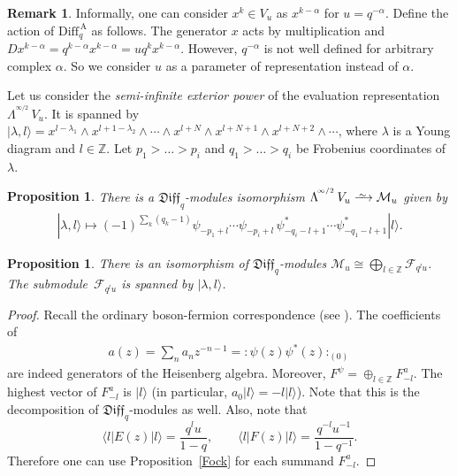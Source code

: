 \documentclass[11pt]{article}
\numberwithin{equation}{section}
\newtheorem{Proposition}[Theorem]{Proposition}
\theoremstyle{definition}
\newtheorem{Remark}[Theorem]{Remark}
\newcommand{\n}{|l \rangle}
\newcommand{\qaD}{\mathrm{Diff}_q^{\, \mathrm{A}}}
\newcommand{\qD}{\mathfrak{Diff}_q}
\newcommand{\siL}{ \Lambda^{^{\! \infty/2}} \,}
\begin{document}
\begin{Remark}Informally, one can consider $x^k \in V_u$ as $x^{k-\alpha}$ for $u=q^{-\alpha}$. Define the action of $\qaD$ as follows. The generator $x$ acts by multiplication and $D x^{k-\alpha} = q^{k-\alpha} x^{k-\alpha} = u q^k x^{k-\alpha}$. However, $q^{-\alpha}$ is not well defined for arbitrary complex $\alpha$. So we consider $u$ as a parameter of representation instead of $\alpha$.
\end{Remark}

Let us consider the \emph{semi-infinite exterior power} of the evaluation representation $\siL V_{u}$. It is spanned by $| \lambda,l \rangle = x^{l-\lambda_1} \wedge x^{l+1-\lambda_2} \wedge \cdots \wedge x^{l+N} \wedge x^{l+N+1} \wedge x^{l+N+2} \wedge \cdots$, where $\lambda$ is a Young diagram and $l \in \mathbb{Z}$. Let $p_1 > \dots> p_i$ and $q_1> \dots> q_i$ be Frobenius coordinates of $\lambda$.

\begin{Proposition} \label{Prop:SemiInf-Fermi}
There is a $\qD$-modules isomorphism $\siL V_{u} \xrightarrow{
\,\smash{\raisebox{-0.65ex}{\ensuremath{\scriptstyle\sim}}}\,} \mathcal{M}_{u}$ given by
\begin{gather}\label{eq:lambda l}
| \lambda,l \rangle \mapsto (-1)^{\sum_k (q_k-1)} \psi_{-p_1+l} \cdots \psi_{-p_i+l} \, \psi_{-q_i-l+1}^* \cdots \psi_{-q_1-l+1}^* \n.
\end{gather}
\end{Proposition}

\begin{Proposition} \label{Boson-Fermion}
There is an isomorphism of $\qD$-modules $\mathcal{M}_u \cong \bigoplus_{l \in \mathbb{Z}} \mathcal{F}_{q^l u}$.
The sub\-module~$\mathcal{F}_{q^l u}$ is spanned by $| \lambda,l \rangle$.
\end{Proposition}

\begin{proof}Recall the ordinary boson-fermion correspondence (see \cite{KR}). The coefficients of
\begin{gather*}
a(z) = \sum_{n} a_n z^{-n-1} = : \! \psi(z) \psi^* (z) \! :_{(0)}
\end{gather*}
are indeed generators of the Heisenberg algebra. Moreover, $F^{\psi} = \oplus_{l \in \mathbb{Z}} F^{a}_{-l}$. The highest vector of $F^{a}_{-l}$ is $\n$ (in particular, $a_0 \n = -l \n $). Note that this is the decomposition of $\qD$-modules as well. Also, note that
\[\langle l | E(z) | l \rangle = \frac{q^{l} u }{1-q}, \qquad \langle l | F(z) | l \rangle = \frac{q^{-l} u^{-1} }{1-q^{-1}}.\]
Therefore one can use Proposition~\ref{Fock} for each summand $F^{a}_{-l}$.
\end{proof}
\end{document}
